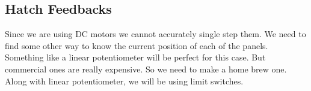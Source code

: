 \documentclass[../../main]{subfiles}
\begin{document}
\subsection{Hatch Feedbacks}

Since we are using DC motors we cannot accurately single step them. We
need to find some other way to know the current position of each of the panels.
Something like a linear potentiometer will be perfect for this case. But commercial
ones are really expensive. So we need to make a home brew one. Along with
linear potentiometer, we will be using limit switches.



\end{document}
